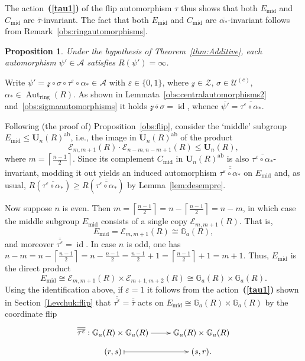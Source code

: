 \documentclass[a4paper,11pt]{amsart}
\makeatletter
\numberwithin{equation}{section}
\theoremstyle{plain}
\newtheorem{pps}[thm]{Proposition}
\theoremstyle{definition}
\renewenvironment{proof}[1][\proofname] {\par\pushQED{\qed}\normalfont\topsep6\p@\@plus6\p@\relax\trivlist\item[\hskip\labelsep\bfseries#1\@addpunct{.}]\ignorespaces}{\popQED\endtrivlist\@endpefalse}
\newcommand{\anel}[1]{#1_{\text{ring}}} %
\newcommand{\mbU}{\mathbf{U}} %
\newcommand{\Addi}{\mathbb{G}_{a}} %
\newcommand{\veps}{\varepsilon} %
\newcommand{\barra}[1]{\overline{#1}}
\newcommand{\set}[1]{\{ #1 \}}
\newcommand{\mc}{\mathcal}
\newcommand{\bref}[1]{{\bf(\ref{#1})}} %
\DeclareMathOperator{\Aut}{Aut}
\DeclareMathOperator{\id}{id}
\makeatother
\begin{document}
\begin{proof}
The action~\bref{tau1} of the flip automorphism $\tau$ thus shows that both $E_{\mathrm{mid}}$ and $C_{\mathrm{mid}}$ are $\barra{\tau}$-invariant. The fact that both $E_{\mathrm{mid}}$ and $C_{\mathrm{mid}}$ are $\overline{\alpha_\ast}$-invariant follows from Remark~\ref{obs:ringautomorphisms}.
\end{proof}

\begin{pps}\label{pps:autA} Under the hypothesis of Theorem~\ref{thm:Additive}, each automorphism $\psi' \in \mc{A}$ satisfies $R(\psi')=\infty$. 
\end{pps}
\begin{proof}
Write $ \psi' = \mc{z} \circ \sigma \circ \tau^\veps \circ \alpha_\ast \in \mc{A}$ with  $\veps \in \set{0,1}$, where $\mc{z} \in \mc{Z}$, $\sigma \in \mc{U}^{(c)}$, $\alpha_\ast \in \anel{\Aut}(R)$.  
 As shown in Lemmata~\ref{obs:centralautomorphisms2} and~\ref{obs:sigmaautomorphisms} it holds $\barra{\mc{z} \circ \sigma} = \id$, whence $\barra{\psi'} = \barra{\tau^\veps \circ \alpha_\ast}$.

Following (the proof of) Proposition~\ref{obs:flip}, consider the `middle' subgroup $E_{\mathrm{mid}} \leq \mbU_n(R)^{\mathrm{ab}}$, i.e., the image in $\mbU_n(R)^{\mathrm{ab}}$ of the product 
\[\mc{E}_{m, m + 1}(R) \cdot \mc{E}_{n-m, n - m + 1}(R) \leq \mbU_n(R),\] 
where $m = \left\lceil \frac{n-1}{2} \right\rceil$. 
Since its complement $C_{\mathrm{mid}}$ in $\mbU_n(R)^{\mathrm{ab}}$ is also $\barra{\tau^\veps \circ \alpha_\ast}$-invariant, modding it out yields an induced automorphism $\barra{\barra{\tau^\veps \circ \alpha_\ast}}$ on $E_{\mathrm{mid}}$ and, as usual, $R(\barra{\tau^\veps \circ \alpha_\ast}) \geq R\left( \barra{\barra{\tau^\veps \circ \alpha_\ast}} \right)$ by Lemma~\ref{lem:desempre}. 

Now suppose $n$ is even. Then $m=\left\lceil \frac{n-1}{2} \right\rceil = n - \left\lceil \frac{n-1}{2} \right\rceil=n-m$, in which case the middle subgroup $E_{\mathrm{mid}}$ consists of a single copy $\mc{E}_{m, m + 1}(R)$. That is, 
\[ E_{\mathrm{mid}} = \mc{E}_{m, m + 1}(R) \cong \Addi(R), \] 
and moreover $\barra{\barra{\tau^\veps}} = \id$. In case $n$ is odd, one has $n-m=n-\left\lceil \frac{n-1}{2} \right\rceil = n - \frac{n-1}{2} = \frac{n-1}{2}+1 = \left\lceil \frac{n-1}{2} \right\rceil + 1=m+1$. Thus, $E_{\mathrm{mid}}$ is the direct product
\[ E_{\mathrm{mid}} \cong \mc{E}_{m, m + 1}(R) \times \mc{E}_{m + 1, m + 2}(R) \cong \Addi(R) \times \Addi(R). \]
Using the identification above, if $\veps = 1$ it follows from the action~\bref{tau1} shown in Section~\ref{Levchuk:flip} that $\barra{\barra{\tau^\veps}} = \barra{\barra{\tau}}$ acts on $E_{\mathrm{mid}} \cong \Addi(R) \times \Addi(R)$ by the coordinate flip 
\[
\xymatrix@R=2mm{
\barra{\barra{\tau^\veps}} : \Addi(R) \times \Addi(R) \ar[r] & \Addi(R) \times \Addi(R) \\
(r,s) \ar@{|->}[r] & (s,r).
}
\]


\end{proof}
\end{document}
